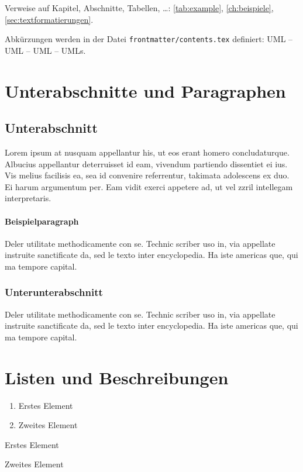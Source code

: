Verweise auf Kapitel, Abschnitte, Tabellen, \dots: \autoref{tab:example}, \autoref{ch:beispiele}, \autoref{sec:textformatierungen}.

Abkürzungen werden in der Datei \texttt{frontmatter/contents.tex} definiert: \ac{UML} -- \acs{UML} -- \acf{UML} -- \acp{UML}. 

\section{Unterabschnitte und Paragraphen}
\subsection{Unterabschnitt}
Lorem ipsum at nusquam appellantur his, ut eos erant homero concludaturque. Albucius appellantur deterruisset id eam, vivendum partiendo dissentiet ei ius. Vis melius facilisis ea, sea id convenire referrentur, takimata adolescens ex duo. Ei harum argumentum per. Eam vidit exerci appetere ad, ut vel zzril intellegam interpretaris.

\paragraph{Beispielparagraph} 
Deler utilitate methodicamente con se. Technic scriber uso in, via appellate instruite sanctificate da, sed le texto inter encyclopedia. Ha iste americas que, qui ma tempore capital. 

\subsubsection{Unterunterabschnitt}
Deler utilitate methodicamente con se. Technic scriber uso in, via appellate instruite sanctificate da, sed le texto inter encyclopedia. Ha iste americas que, qui ma tempore capital. 


\section{Listen und Beschreibungen}

\begin{enumerate}
    \item Erstes Element
    \item Zweites Element 
\end{enumerate}

\lipsum[1]

\begin{aenumerate}
    \item Erstes Element
    \item Zweites Element
\end{aenumerate}

